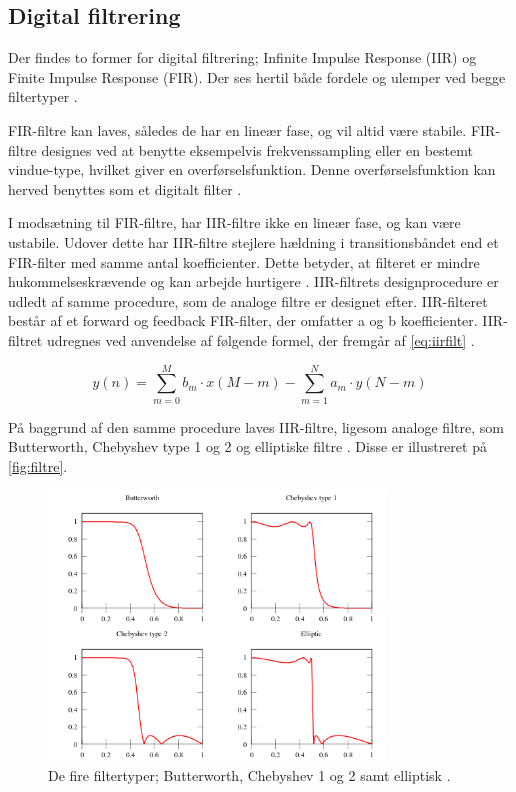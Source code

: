 \subsection{Digital filtrering} \label{sec:teori_filter}
Der findes to former for digital filtrering; Infinite Impulse Response (IIR) og Finite Impulse Response (FIR). Der ses hertil både fordele og ulemper ved begge filtertyper \citep{blandford2012}.

FIR-filtre kan laves, således de har en lineær fase, og vil altid være stabile. 
FIR-filtre designes ved at benytte eksempelvis frekvenssampling eller en bestemt vindue-type, hvilket giver en overførselsfunktion. 
Denne overførselsfunktion kan herved benyttes som et digitalt filter \citep{blandford2012}. 

I modsætning til FIR-filtre, har IIR-filtre ikke en lineær fase, og kan være ustabile. 
Udover dette har IIR-filtre stejlere hældning i transitionsbåndet end et FIR-filter med samme antal koefficienter. 
Dette betyder, at filteret er mindre hukommelseskrævende og kan arbejde hurtigere \citep{blandford2012}. 
IIR-filtrets designprocedure er udledt af samme procedure, som de analoge filtre er designet efter.
IIR-filteret består af et forward og feedback FIR-filter, der omfatter a og b koefficienter. 
IIR-filtret udregnes ved anvendelse af følgende formel, der fremgår af \autoref{eq:iirfilt} \citep{francis2009}. 

\begin{equation} \label{eq:iirfilt}
	y(n)= \sum_{m=0}^{M} b_{m} \cdot x(M-m)- \sum^{N}_{m=1} a_{m} \cdot y(N-m)
\end{equation}

\noindent
På baggrund af den samme procedure laves IIR-filtre, ligesom analoge filtre, som Butterworth, Chebyshev type 1 og 2 og elliptiske filtre \citep{blandford2012}. Disse er illustreret på \autoref{fig:filtre}.

\begin{figure}[H]
\centering
\includegraphics[width=0.8\textwidth]{figures/filtre}
\caption{De fire filtertyper; Butterworth, Chebyshev 1 og 2 samt elliptisk \citep{wikipedia2016}.}
\label{fig:filtre}
\end{figure}

